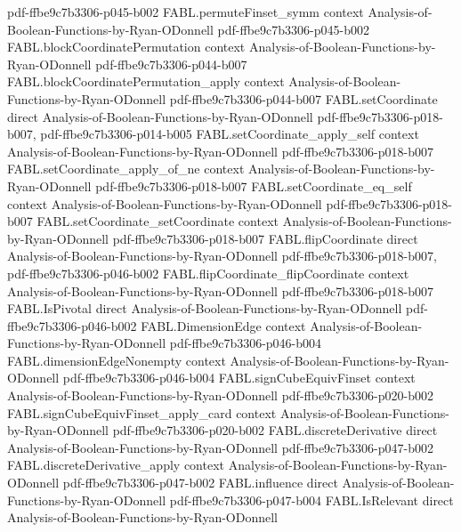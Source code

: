\begin{theorem}
  {pdf-ffbe9c7b3306-p045-b002}
\proofstep
  {FABL.permuteFinset_symm}
  {context}
  {Analysis-of-Boolean-Functions-by-Ryan-ODonnell}
  {pdf-ffbe9c7b3306-p045-b002}
\proofstep
  {FABL.blockCoordinatePermutation}
  {context}
  {Analysis-of-Boolean-Functions-by-Ryan-ODonnell}
  {pdf-ffbe9c7b3306-p044-b007}
\proofstep
  {FABL.blockCoordinatePermutation_apply}
  {context}
  {Analysis-of-Boolean-Functions-by-Ryan-ODonnell}
  {pdf-ffbe9c7b3306-p044-b007}
\proofstep
  {FABL.setCoordinate}
  {direct}
  {Analysis-of-Boolean-Functions-by-Ryan-ODonnell}
  {pdf-ffbe9c7b3306-p018-b007,
    pdf-ffbe9c7b3306-p014-b005}
\proofstep
  {FABL.setCoordinate_apply_self}
  {context}
  {Analysis-of-Boolean-Functions-by-Ryan-ODonnell}
  {pdf-ffbe9c7b3306-p018-b007}
\proofstep
  {FABL.setCoordinate_apply_of_ne}
  {context}
  {Analysis-of-Boolean-Functions-by-Ryan-ODonnell}
  {pdf-ffbe9c7b3306-p018-b007}
\proofstep
  {FABL.setCoordinate_eq_self}
  {context}
  {Analysis-of-Boolean-Functions-by-Ryan-ODonnell}
  {pdf-ffbe9c7b3306-p018-b007}
\proofstep
  {FABL.setCoordinate_setCoordinate}
  {context}
  {Analysis-of-Boolean-Functions-by-Ryan-ODonnell}
  {pdf-ffbe9c7b3306-p018-b007}
\proofstep
  {FABL.flipCoordinate}
  {direct}
  {Analysis-of-Boolean-Functions-by-Ryan-ODonnell}
  {pdf-ffbe9c7b3306-p018-b007,
    pdf-ffbe9c7b3306-p046-b002}
\proofstep
  {FABL.flipCoordinate_flipCoordinate}
  {context}
  {Analysis-of-Boolean-Functions-by-Ryan-ODonnell}
  {pdf-ffbe9c7b3306-p018-b007}
\proofstep
  {FABL.IsPivotal}
  {direct}
  {Analysis-of-Boolean-Functions-by-Ryan-ODonnell}
  {pdf-ffbe9c7b3306-p046-b002}
\proofstep
  {FABL.DimensionEdge}
  {context}
  {Analysis-of-Boolean-Functions-by-Ryan-ODonnell}
  {pdf-ffbe9c7b3306-p046-b004}
\proofstep
  {FABL.dimensionEdgeNonempty}
  {context}
  {Analysis-of-Boolean-Functions-by-Ryan-ODonnell}
  {pdf-ffbe9c7b3306-p046-b004}
\proofstep
  {FABL.signCubeEquivFinset}
  {context}
  {Analysis-of-Boolean-Functions-by-Ryan-ODonnell}
  {pdf-ffbe9c7b3306-p020-b002}
\proofstep
  {FABL.signCubeEquivFinset_apply_card}
  {context}
  {Analysis-of-Boolean-Functions-by-Ryan-ODonnell}
  {pdf-ffbe9c7b3306-p020-b002}
\proofstep
  {FABL.discreteDerivative}
  {direct}
  {Analysis-of-Boolean-Functions-by-Ryan-ODonnell}
  {pdf-ffbe9c7b3306-p047-b002}
\proofstep
  {FABL.discreteDerivative_apply}
  {context}
  {Analysis-of-Boolean-Functions-by-Ryan-ODonnell}
  {pdf-ffbe9c7b3306-p047-b002}
\proofstep
  {FABL.influence}
  {direct}
  {Analysis-of-Boolean-Functions-by-Ryan-ODonnell}
  {pdf-ffbe9c7b3306-p047-b004}
\proofstep
  {FABL.IsRelevant}
  {direct}
  {Analysis-of-Boolean-Functions-by-Ryan-ODonnell}

\end{theorem}
